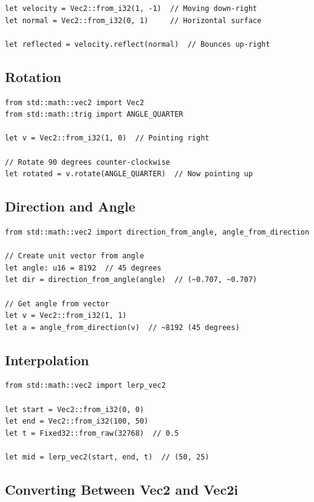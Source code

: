 \begin{lstlisting}
let velocity = Vec2::from_i32(1, -1)  // Moving down-right
let normal = Vec2::from_i32(0, 1)     // Horizontal surface

let reflected = velocity.reflect(normal)  // Bounces up-right
\end{lstlisting}

\subsection{Rotation}

\begin{lstlisting}
from std::math::vec2 import Vec2
from std::math::trig import ANGLE_QUARTER

let v = Vec2::from_i32(1, 0)  // Pointing right

// Rotate 90 degrees counter-clockwise
let rotated = v.rotate(ANGLE_QUARTER)  // Now pointing up
\end{lstlisting}

\subsection{Direction and Angle}

\begin{lstlisting}
from std::math::vec2 import direction_from_angle, angle_from_direction

// Create unit vector from angle
let angle: u16 = 8192  // 45 degrees
let dir = direction_from_angle(angle)  // (~0.707, ~0.707)

// Get angle from vector
let v = Vec2::from_i32(1, 1)
let a = angle_from_direction(v)  // ~8192 (45 degrees)
\end{lstlisting}

\subsection{Interpolation}

\begin{lstlisting}
from std::math::vec2 import lerp_vec2

let start = Vec2::from_i32(0, 0)
let end = Vec2::from_i32(100, 50)
let t = Fixed32::from_raw(32768)  // 0.5

let mid = lerp_vec2(start, end, t)  // (50, 25)
\end{lstlisting}

\subsection{Converting Between Vec2 and Vec2i}

